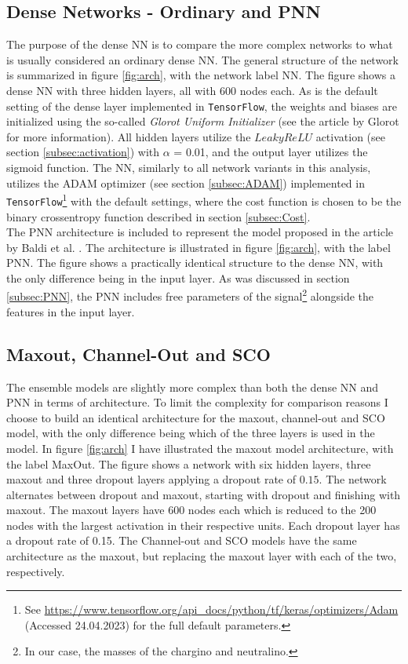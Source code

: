 \subsection*{Dense Networks - Ordinary and PNN}\label{subsec:PNNArch}
The purpose of the dense \ac{NN} is to compare the more complex networks to what is usually considered an ordinary dense \ac{NN}.
The general structure of the network is summarized in figure \ref{fig:arch}, with the network label \ac{NN}. The figure shows a dense \ac{NN} with 
three hidden layers, all with 600 nodes each.  As is the default setting of the dense layer implemented in \verb!TensorFlow!, the weights and biases are initialized 
using the so-called \emph{Glorot Uniform Initializer} (see the article by Glorot \cite{glorot_understanding_2010} for more information). All hidden layers 
utilize the $LeakyReLU$ activation (see section \ref{subsec:activation}) with $\alpha$ = 0.01, and the output layer utilizes the sigmoid function.  
The \ac{NN}, similarly to all network variants in this analysis, utilizes the \ac{ADAM} optimizer (see section \ref{subsec:ADAM}) implemented in 
\verb!TensorFlow!\footnote{See \url{https://www.tensorflow.org/api_docs/python/tf/keras/optimizers/Adam}
(Accessed 24.04.2023) for the full default parameters.} with the default settings, where the cost function is chosen to be the binary crossentropy function described
in section \ref{subsec:Cost}. 
\\
The \ac{PNN} architecture is included to represent the model proposed in the article by Baldi et al. \cite{PNN}.
The architecture is illustrated in figure \ref{fig:arch}, with the label \ac{PNN}. The figure shows a practically identical 
structure to the dense \ac{NN}, with the only difference being in the input layer. As was discussed in section \ref{subsec:PNN},
the \ac{PNN} includes free parameters of the signal\footnote{In our case, the masses of the chargino and neutralino.} alongside the features
in the input layer.
\subsection*{Maxout, Channel-Out and SCO}\label{subsec:LWTAARch}
The ensemble models are slightly more complex than both the dense \ac{NN} and \ac{PNN} in terms of architecture. To limit the complexity for comparison reasons
I choose to build an identical architecture for the maxout, channel-out and \ac{SCO} model, with the only difference being which of the three layers is used in the model.  
In figure \ref{fig:arch} I have illustrated the maxout model architecture, with the label MaxOut. The figure shows a network with six hidden layers, 
three maxout and three dropout layers applying a dropout rate of $0.15$. The network alternates between dropout and maxout, starting with dropout and finishing with maxout. The maxout layers 
have 600 nodes each which is reduced to the 200 nodes with the largest activation in their respective units. Each dropout layer has a dropout 
rate of 0.15. The Channel-out and \ac{SCO} models have the same architecture as the maxout, but replacing the maxout layer with each of the two, respectively.  

